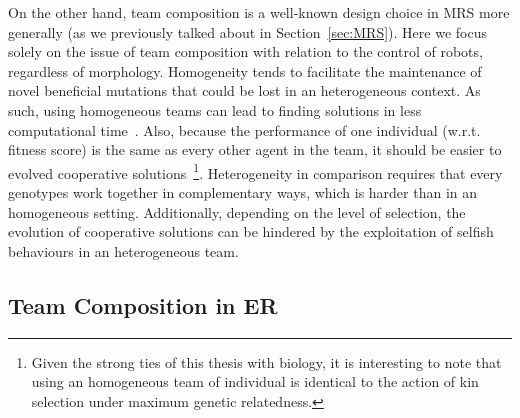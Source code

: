     On the other hand, team composition is a well-known design choice in MRS more generally (as we previously talked about in Section~\ref{sec:MRS}). Here we focus solely on the issue of team composition with relation to the control of robots, regardless of morphology. Homogeneity tends to facilitate the maintenance of novel beneficial mutations that could be lost in an heterogeneous context. As such, using homogeneous teams can lead to finding solutions in less computational time~\parencite{Quinn2001}. Also, because the performance of one individual (w.r.t. fitness score) is the same as every other agent in the team, it should be easier to evolved cooperative solutions~\footnote{Given the strong ties of this thesis with biology, it is interesting to note that using an homogeneous team of individual is identical to the action of kin selection under maximum genetic relatedness.}. Heterogeneity in comparison requires that every genotypes work together in complementary ways, which is harder than in an homogeneous setting. Additionally, depending on the level of selection, the evolution of cooperative solutions can be hindered by the exploitation of selfish behaviours in an heterogeneous team.

  \subsection{Team Composition in ER} %

